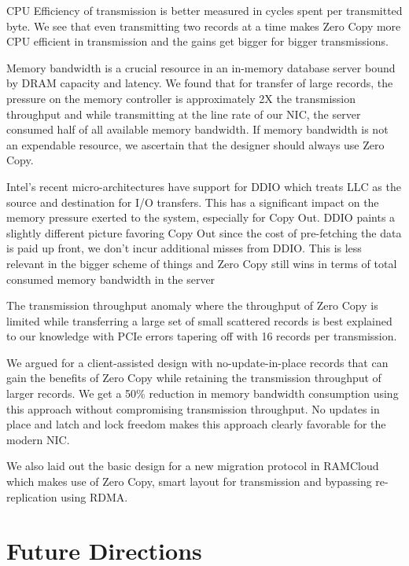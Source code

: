 CPU Efficiency of transmission is better measured in cycles spent per transmitted byte. We see that even transmitting two records at a time makes 
Zero Copy more CPU efficient in transmission and the gains get bigger for bigger transmissions.

Memory bandwidth is a crucial resource in an in-memory database server bound by DRAM capacity and latency. We found that for transfer of large 
records, the pressure on the memory controller is approximately 2X the transmission throughput and while transmitting at the line rate of our NIC, 
the server consumed half of all available memory bandwidth. If memory bandwidth is not an expendable resource, we ascertain that the designer should 
always use Zero Copy.
  
Intel\textregistered's recent micro-architectures have support for DDIO which treats LLC as the source and destination for I/O transfers. This has a significant impact on 
the memory pressure exerted to the system, especially for Copy Out. DDIO paints a slightly different picture favoring Copy Out since the cost of pre-fetching the data is 
paid up front, we don't incur additional misses from DDIO. This is less relevant in the bigger scheme of things and Zero Copy still wins in terms of total 
consumed memory bandwidth in the server
  
The transmission throughput anomaly where the throughput of Zero Copy is limited while transferring a large set of small scattered records is best explained to 
our knowledge with PCIe errors tapering off with 16 records per transmission.
 
We argued for a client-assisted design with no-update-in-place records that can gain the benefits of Zero Copy while retaining the transmission throughput of larger records. 
We get a 50\% reduction in memory bandwidth consumption using this approach without compromising transmission throughput. 
No updates in place and latch and lock freedom makes this approach clearly favorable for the modern NIC. 

We also laid out the basic design for a new migration protocol in RAMCloud which makes use of Zero Copy, smart layout for transmission and bypassing re-replication using 
RDMA.

\section{Future Directions}

